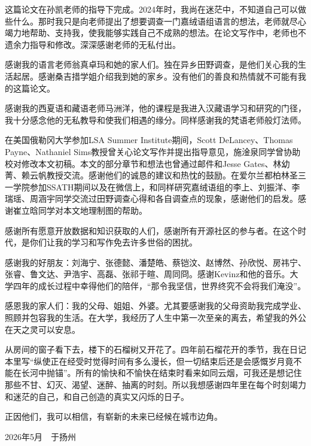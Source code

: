 \documentclass[
    decl-page,  %
    twoside,                %
    cjk-font = win,
    latin-font = none,
  ]{njuthesis}
\begin{document}
\begin{acknowledgement}
  这篇论文在孙凯老师的指导下完成。2024年时，我尚在迷茫中，不知道自己可以做些什么。那时我只是向老师提出了想要调查一门嘉绒语组语言的想法，老师就尽心竭力地帮助、支持我，使我能够实践自己不成熟的想法。在论文写作中，老师也不遗余力指导和修改。深深感谢老师的无私付出。

  感谢我的语言老师翁真卓玛和她的家人们。独在异乡田野调查，是他们关心我的生活起居。感谢桑吉措学姐介绍我到她的家乡。没有他们的善良和热情就不可能有我的这篇论文。
  
  感谢我的西夏语和藏语老师马洲洋，他的课程是我进入汉藏语学习和研究的门径，我十分感念他的无私教导和使我们相遇的缘分。同样感谢我的梵语老师般灯法师。
  
  在美国俄勒冈大学参加LSA Summer Institute期间，Scott DeLancey、Thomas Payne、Nathaniel Sims教授曾关心论文写作并提出指导意见，施淦泉同学曾协助校对修改本文初稿。本文的部分章节和想法也曾通过邮件和Jesse Gates、林幼菁、赖云帆教授交流。感谢他们的诚恳的建议和热忱的鼓励。在爱尔兰都柏林圣三一学院参加SSATH期间以及在微信上，和同样研究嘉绒语组的李上、刘振洋、李瑞瑶、周涵宇同学交流过田野调查心得和各自调查点的现象，感谢他们的启发。感谢崔立晗同学对本文地理制图的帮助。

  感谢所有愿意开放数据和知识获取的人们，感谢所有开源社区的参与者。在这个时代，是你们让我的学习和写作免去许多世俗的困扰。
  
  感谢我的好朋友：刘海宁、张德懿、潘楚皓、蔡铠汶、赵博然、孙欣悦、房祎宁、张睿、鲁文达、尹浩宇、高磊、张祁于暄、周同冏。感谢Kevinz和他的音乐。大学四年的成长过程中幸得他们的陪伴，“那令我坚信，世界终究不会将我们淹没”。

  感恩我的家人们：我的父母、姐姐、外婆。尤其要感谢我的父母资助我完成学业、照顾并包容我的生活。在大学，我经历了人生中第一次至亲的离去，希望我的外公在天之灵可以安息。

  从房间的窗子看下去，楼下的石榴树又开花了。四年前石榴花开的季节，我在日记本里写“纵使正在经受时觉得时间有多么漫长，但一切结束后还是会感慨岁月竟不能在长河中抛锚”。所有的愉快和不愉快在结束时看来如同云烟，可我还是想记住那些不甘、幻灭、渴望、迷醉、抽离的时刻。所以我想感谢四年里在每个时刻竭力和迷茫的自己，和自己创造的真实又闪烁的日子。

  正因他们，我可以相信，有崭新的未来已经候在城市边角。
  
  \begin{flushright}
  2026年5月\ \ 于扬州
\end{flushright}
\end{acknowledgement}

\end{document}
